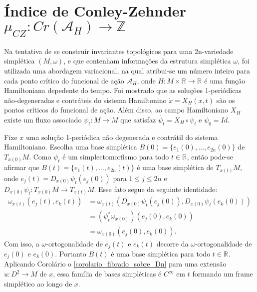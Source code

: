 \documentclass[12pt]{book}
\newcommand{\campohamiltoniano}[1]{X_{H}(#1)}
\newcommand{\campohamiltonianoabrev}{X_{H}}
\newcommand{\espacotangenteponto}[2]{T_{#1}#2}
\newcommand{\funcionalH}{\mathcal{A}_{H}}
\newcommand{\iconleyabrev}{\mu_{CZ}}
\newcommand{\inteiros}{\mathbb{Z}}
\newcommand{\pontoscriticos}[1]{\textit{Cr}(#1)}
\newcommand{\real}[1]{\mathbb{R}^{#1}}
\newcommand{\reta}{\real{}}
\begin{document}
	\section{Índice de Conley-Zehnder $\iconleyabrev: \pontoscriticos{\funcionalH}\to \inteiros$}\label{secao_indice_conley}
	
	Na tentativa de se construir invariantes topológicos para uma 2n-variedade simplética $(M, \omega)$, e que contenham informações da estrutura simplética $\omega$, foi utilizada uma abordagem variacional, na qual atribui-se um número inteiro para cada ponto crítico do funcional de ação $\funcionalH$, onde $H: M\times \reta\to \reta$ é uma função Hamiltoniana depedente do tempo. Foi mostrado que as soluções 1-periódicas não-degeneradas e contráteis do sistema Hamiltonino $\dot{x} = \campohamiltoniano{x, t}$ são os pontos críticos do funcional de ação. Além disso, ao campo Hamiltoniano $\campohamiltonianoabrev$ existe um fluxo associado $\psi_{t}:M\to M$ que satisfaz $\dot{\psi_{t}} =\campohamiltonianoabrev\circ\psi_{t}$ e $\psi_{0}=Id$.
	
	Fixe $x $ uma solução 1-periódica não degenerada e contrátil do sistema Hamiltoniano. Escolha uma base simplética $B(0) = \{e_{1}(0),\dots,e_{2n}(0)\}$ de $\espacotangenteponto{x(0)}{M}$. Como $\psi_{t}$ é um simplectomorfismo para todo $t\in \reta$, então pode-se afirmar que $B(t) = \{e_{1}(t), \dots, e_{2n}(t)\}$ é uma base simplética de $\espacotangenteponto{x(t)}{M}$, onde $e_{j}(t) = D_{x(0)}\psi_{t}(e_{j}(0))$ para $1\leq j \leq 2n$ e $D_{x(0)}\psi_{t}: \espacotangenteponto{x(0)}{M}\to \espacotangenteponto{x(t)}{M}$. Esse fato segue da seguinte identidade:
	$$
	\begin{aligned}
	\omega_{x(t)}(e_{j}(t), e_{k}(t))
	&=
	\omega_{x(t)}(D_{x(0)}\psi_{t}(e_{j}(0)), D_{x(0)}\psi_{t}(e_{k}(0)))
	\\
	&=	(\psi^{*}_{t}\omega_{x(0)})(e_{j}(0), e_{k}(0))
	\\
	&=	\omega_{x(0)}(e_{j}(0), e_{k}(0)).
	\end{aligned}
	$$
	Com isso, a $\omega$-ortogonalidade de $e_{j}(t)$ e $e_{k}(t)$ decorre da $\omega$-ortogonalidade de $e_{j}(0)$ e $e_{k}(0)$. Portanto $B(t)$ é uma base simplética para todo $t\in \reta$. Aplicando Corolário o \ref{corolario_fibrado_sobre_Dn} para uma extensão $u:D^{2} \to M$ de $x$, essa família de bases simpléticas é $C^{\infty}$ em $t$ formando um frame simplético ao longo de $x$. 
	
\end{document}
